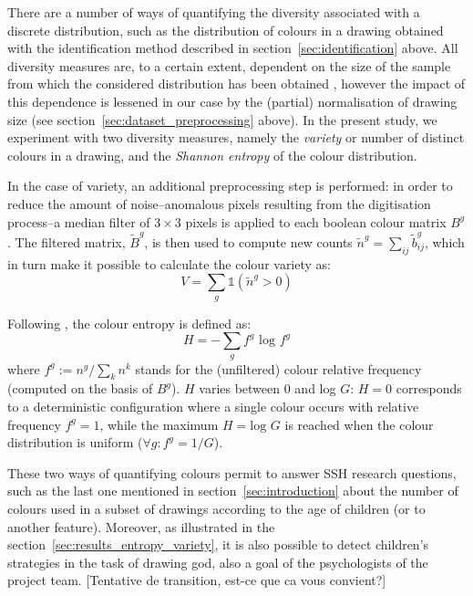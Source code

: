 \documentclass[11pt,a4paper]{article}
\begin{document}
There are a number of ways of quantifying the diversity associated with a discrete distribution, such as the distribution of colours in a drawing obtained with the identification method described in section~\ref{sec:identification} above. All diversity measures are, to a certain extent, dependent on the size of the sample from which the considered distribution has been obtained \cite[see e.g.][]{TweedieBaayen1998}, however the impact of this dependence is lessened in our case by the (partial) normalisation of drawing size (see section~\ref{sec:dataset_preprocessing} above). In the present study, we experiment with two diversity measures, namely the {\em variety} or number of distinct colours in a drawing, and the {\em Shannon entropy} of the colour distribution.

In the case of variety, an additional preprocessing step is performed: in order to reduce the amount of noise--anomalous pixels resulting from the digitisation process--a median filter of \(3 \times 3\) pixels is applied to each boolean colour matrix $B^{g}$. The filtered matrix, $\tilde{B}^{g}$, is then used to compute new counts $\tilde{n}^{g} = \sum_{ij}\tilde{b}_{ij}^{g}$, which in turn make it possible to calculate the colour variety as:
\begin{equation}
	V = \sum_{g}\mathds{1}(\tilde{n}^{g} > 0)
\end{equation}

Following \citet{Shannon1948}, the colour entropy is defined as:
\begin{equation}
	H = -\sum_{g} f^{g}\mbox{ log }f^{g}
\end{equation}
where $f^{g}:= n^{g}/\sum_{k}n^{k}$ stands for the (unfiltered) colour relative frequency (computed on the basis of $B^{g}$). $H$ varies between 0 and log $G$: $H=0$ corresponds to a deterministic configuration where a single colour occurs with relative frequency $f^{g} = 1$, while the maximum $H=\mbox{log }G$ is reached when the colour distribution is uniform ($\forall g: f^{g} = 1/G$).

These two ways of quantifying colours permit to answer SSH research questions, such as the last one mentioned in section~\ref{sec:introduction} about the number of colours used in a subset of drawings according to the age of children (or to another feature). Moreover, as illustrated in the section~\ref{sec:results_entropy_variety}, it is also possible to detect children's strategies in the task of drawing god, also a goal of the psychologists of the project team. {\color{red} [Tentative de transition, est-ce que ca vous convient?]}
\end{document}
